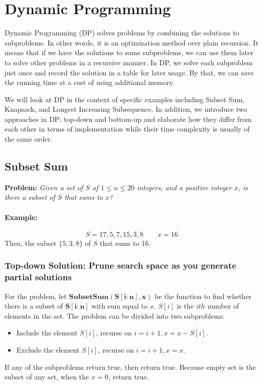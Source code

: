 \documentclass[11pt]{article}
\theoremstyle{definition}
\begin{document}
\section{Dynamic Programming}
Dynamic Programming (DP) solves problems by combining the solutions to subproblems. In other words, it is an optimization method over plain recursion. It means that if we have the solutions to some subproblems, we can use them later to solve other problems in a recursive manner. In DP, we solve each subproblem just once and record the solution in a table for later usage. By that, we can save the running time at a cost of using additional memory.

We will look at DP in the context of specific examples including Subset Sum, Knapsack, and Longest Increasing Subsequence. In addition, we introduce two approaches in DP: top-down and bottom-up and elaborate how they differ from each other in terms of implementation while their time complexity is usually of the same order.
\subsection{Subset Sum}
\textbf{ Problem:}  \textit{Given a set of $S$ of $1\leq n\leq 20$ integers,
and a positive integer $x$, is there a subset of $S$ that sums to $x$?}
\paragraph{Example:}
\[
S={17,5,7,15,3,8} \qquad x = 16
\]
Then, the subset $\{5,3,8\}$ of $S$ that sums to 16.

\subsubsection{Top-down Solution: Prune search space as you generate partial solutions}
For the problem, let $\mathbf{SubsetSum(S[i:n], x)}$ be the function to find whether there is a subset of $\mathbf{S[i:n]}$ with sum equal to $x$. $S[i]$ is the $ith$ number of elements in the set.
The problem can be divided into two subproblems:
\begin{itemize}
    \item Include the element $S[i]$, recurse on $i = i+1, x = x-S[i]$.
    \item Exclude the element $S[i]$, recurse on $i = i+1, x = x$.
\end{itemize}


If any of the subproblems return true, then return true.  Because empty set is the subset of any set, when the $x=0$, return true. 
\end{document}
